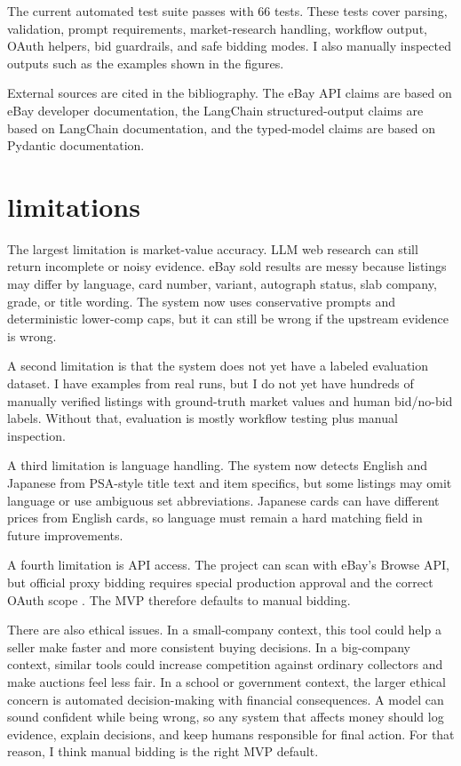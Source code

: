 \documentclass[10pt,twocolumn]{article}
\begin{document}
The current automated test suite passes with 66 tests. These tests cover parsing, validation, prompt requirements, market-research handling, workflow output, OAuth helpers, bid guardrails, and safe bidding modes. I also manually inspected outputs such as the examples shown in the figures.

External sources are cited in the bibliography. The eBay API claims are based on eBay developer documentation, the LangChain structured-output claims are based on LangChain documentation, and the typed-model claims are based on Pydantic documentation.

\section{limitations}

The largest limitation is market-value accuracy. LLM web research can still return incomplete or noisy evidence. eBay sold results are messy because listings may differ by language, card number, variant, autograph status, slab company, grade, or title wording. The system now uses conservative prompts and deterministic lower-comp caps, but it can still be wrong if the upstream evidence is wrong.

A second limitation is that the system does not yet have a labeled evaluation dataset. I have examples from real runs, but I do not yet have hundreds of manually verified listings with ground-truth market values and human bid/no-bid labels. Without that, evaluation is mostly workflow testing plus manual inspection.

A third limitation is language handling. The system now detects English and Japanese from PSA-style title text and item specifics, but some listings may omit language or use ambiguous set abbreviations. Japanese cards can have different prices from English cards, so language must remain a hard matching field in future improvements.

A fourth limitation is API access. The project can scan with eBay's Browse API, but official proxy bidding requires special production approval and the correct OAuth scope \cite{ebayproxybid}. The MVP therefore defaults to manual bidding.

There are also ethical issues. In a small-company context, this tool could help a seller make faster and more consistent buying decisions. In a big-company context, similar tools could increase competition against ordinary collectors and make auctions feel less fair. In a school or government context, the larger ethical concern is automated decision-making with financial consequences. A model can sound confident while being wrong, so any system that affects money should log evidence, explain decisions, and keep humans responsible for final action. For that reason, I think manual bidding is the right MVP default.
\end{document}
